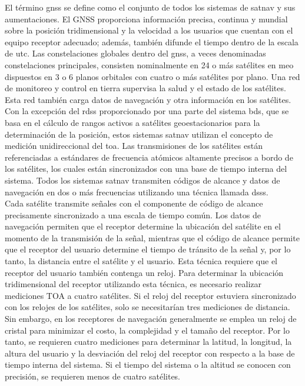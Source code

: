 \begin{justify}
    El término \gls{gnss} se define como el conjunto de todos los sistemas de \gls{satnav} y sus aumentaciones. El GNSS proporciona información precisa, continua y mundial
    sobre la posición tridimensional y la velocidad a los usuarios que cuentan con el equipo receptor adecuado; además, también difunde el tiempo dentro de la escala de \gls{utc}.
    Las constelaciones globales dentro del \gls{gnss}, a veces denominadas constelaciones principales, consisten nominalmente en 24 o más satélites en \gls{meo} dispuestos
    en 3 o 6 planos orbitales con cuatro o más satélites por plano. Una red de monitoreo y control en tierra supervisa la salud y el estado de los satélites.
    Esta red también carga datos de navegación y otra información en los satélites.\\

    Con la excepción del \gls{rdss} proporcionado por una parte del sistema \gls{bds}, que se basa en el cálculo de rangos activos a satélites geoestacionarios para la determinación
    de la posición, estos sistemas \gls{satnav} utilizan el concepto de medición unidireccional del \gls{toa}. Las transmisiones de los satélites están referenciadas a estándares
    de frecuencia atómicos altamente precisos a bordo de los satélites, los cuales están sincronizados con una base de tiempo interna del sistema. Todos los sistemas
    \gls{satnav} transmiten códigos de alcance y datos de navegación en dos o más frecuencias utilizando una técnica llamada \gls{dsss}.\\

    Cada satélite transmite señales con el componente de código de alcance precisamente sincronizado a una escala de tiempo común. Los datos de navegación permiten que el
    receptor determine la ubicación del satélite en el momento de la transmisión de la señal, mientras que el código de alcance permite que el receptor del usuario determine
    el tiempo de tránsito de la señal y, por lo tanto, la distancia entre el satélite y el usuario. Esta técnica requiere que el receptor del usuario también contenga un reloj.
    Para determinar la ubicación tridimensional del receptor utilizando esta técnica, es necesario realizar mediciones TOA a cuatro satélites. Si el reloj del receptor
    estuviera sincronizado con los relojes de los satélites, solo se necesitarían tres mediciones de distancia. Sin embargo, en los receptores de navegación generalmente
    se emplea un reloj de cristal para minimizar el costo, la complejidad y el tamaño del receptor. Por lo tanto, se requieren cuatro mediciones para determinar la latitud,
    la longitud, la altura del usuario y la desviación del reloj del receptor con respecto a la base de tiempo interna del sistema. Si el tiempo del sistema o la altitud se
    conocen con precisión, se requieren menos de cuatro satélites.
\end{justify}